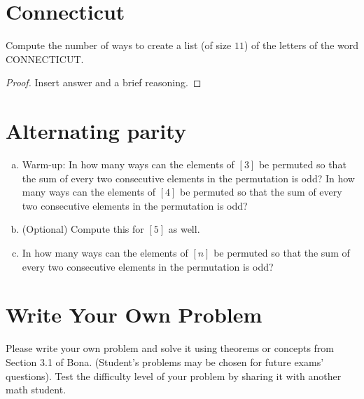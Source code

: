 \documentclass[12pt]{amsart}
\begin{document}
\section{Connecticut}
Compute the number of ways to create a  list (of size $11$) of the letters of the word CONNECTICUT. 
\begin{proof}
Insert answer and a brief reasoning.
\end{proof}

\section{Alternating parity}
\begin{enumerate}[a)]
    \item Warm-up: In how many ways can the elements of $[3]$ be permuted so that the sum of every two consecutive elements in the permutation is odd? 
    In how many ways can the elements of $[4]$ be permuted so that the sum of every two consecutive elements in the permutation is odd?

    \item (Optional) Compute this for $[5]$ as well.

    \item In how many ways can the elements of $[n]$ be permuted so that the sum of every two consecutive elements in the permutation is odd?
\end{enumerate}



\section{Write Your Own Problem}\label{sec:write_your_own}
Please write your own problem and solve it using theorems or concepts from Section 3.1 of Bona.
(Student's problems may be chosen for future exams' questions). Test the difficulty level of your problem by sharing it with another math student. 
\end{document}
